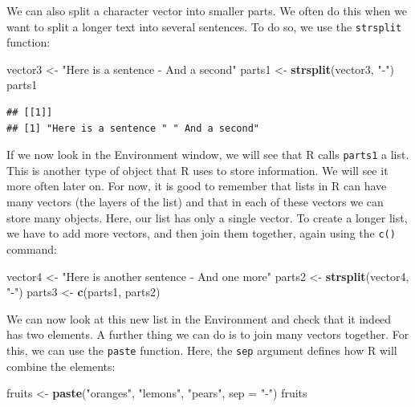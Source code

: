 \documentclass[
]{book}
\newenvironment{Shaded}{\begin{snugshade}}{\end{snugshade}}
\newcommand{\AttributeTok}[1]{\textcolor[rgb]{0.13,0.29,0.53}{#1}}
\newcommand{\FunctionTok}[1]{\textcolor[rgb]{0.13,0.29,0.53}{\textbf{#1}}}
\newcommand{\NormalTok}[1]{#1}
\newcommand{\OtherTok}[1]{\textcolor[rgb]{0.56,0.35,0.01}{#1}}
\newcommand{\StringTok}[1]{\textcolor[rgb]{0.31,0.60,0.02}{#1}}
\begin{document}
We can also split a character vector into smaller parts. We often do this when we want to split a longer text into several sentences. To do so, we use the \texttt{strsplit} function:

\begin{Shaded}
\begin{Highlighting}[]
\NormalTok{vector3 }\OtherTok{\textless{}{-}} \StringTok{"Here is a sentence {-} And a second"}
\NormalTok{parts1 }\OtherTok{\textless{}{-}} \FunctionTok{strsplit}\NormalTok{(vector3, }\StringTok{"{-}"}\NormalTok{)}
\NormalTok{parts1}
\end{Highlighting}
\end{Shaded}

\begin{verbatim}
## [[1]]
## [1] "Here is a sentence " " And a second"
\end{verbatim}

If we now look in the Environment window, we will see that R calls \texttt{parts1} a list. This is another type of object that R uses to store information. We will see it more often later on. For now, it is good to remember that lists in R can have many vectors (the layers of the list) and that in each of these vectors we can store many objects. Here, our list has only a single vector. To create a longer list, we have to add more vectors, and then join them together, again using the \texttt{c()} command:

\begin{Shaded}
\begin{Highlighting}[]
\NormalTok{vector4 }\OtherTok{\textless{}{-}} \StringTok{"Here is another sentence {-} And one more"}
\NormalTok{parts2 }\OtherTok{\textless{}{-}} \FunctionTok{strsplit}\NormalTok{(vector4, }\StringTok{"{-}"}\NormalTok{)}
\NormalTok{parts3 }\OtherTok{\textless{}{-}} \FunctionTok{c}\NormalTok{(parts1, parts2)}
\end{Highlighting}
\end{Shaded}

We can now look at this new list in the Environment and check that it indeed has two elements. A further thing we can do is to join many vectors together. For this, we can use the \texttt{paste} function. Here, the \texttt{sep} argument defines how R will combine the elements:

\begin{Shaded}
\begin{Highlighting}[]
\NormalTok{fruits }\OtherTok{\textless{}{-}} \FunctionTok{paste}\NormalTok{(}\StringTok{"oranges"}\NormalTok{, }\StringTok{"lemons"}\NormalTok{, }\StringTok{"pears"}\NormalTok{, }\AttributeTok{sep =} \StringTok{"{-}"}\NormalTok{)}
\NormalTok{fruits}
\end{Highlighting}
\end{Shaded}
\end{document}
